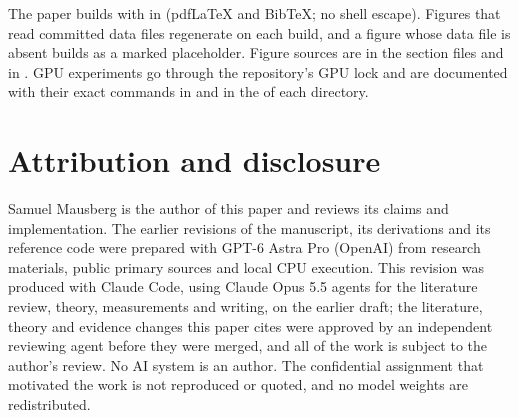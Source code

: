 The paper builds with  in  (pdfLaTeX and BibTeX; no shell escape). Figures that read committed data files regenerate on each build, and a figure whose data file is absent builds as a marked placeholder. Figure sources are in the section files and in . GPU experiments go through the repository's GPU lock and are documented with their exact commands in  and in the  of each  directory.

\section{Attribution and disclosure}\label{app:attribution}
Samuel Mausberg is the author of this paper and reviews its claims and implementation. The earlier revisions of the manuscript, its derivations and its reference code were prepared with GPT-6 Astra Pro (OpenAI) from research materials, public primary sources and local CPU execution. This revision was produced with Claude Code, using Claude Opus 5.5 agents for the literature review, theory, measurements and writing, on the earlier draft; the literature, theory and evidence changes this paper cites were approved by an independent reviewing agent before they were merged, and all of the work is subject to the author's review. No AI system is an author. The confidential assignment that motivated the work is not reproduced or quoted, and no model weights are redistributed.
